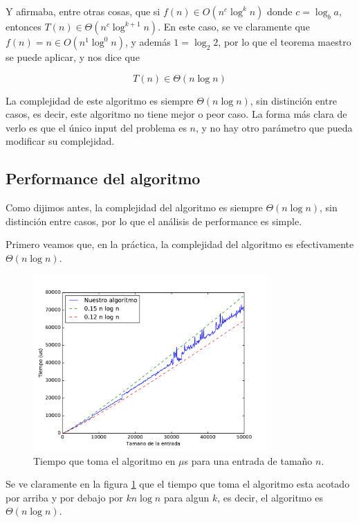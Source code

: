 Y afirmaba, entre otras cosas, que si $f(n) \in O(n^c \log^k n)$ donde $c = \log_b a$, entonces $T(n) \in \Theta(n^c \log^{k+1} n)$. En este caso, se ve claramente que $f(n) = n \in O(n^1 \log^0 n)$, y además $1 = \log_2 2$, por lo que el teorema maestro se puede aplicar, y nos dice que

\[T(n) \in \Theta(n \log n)\]

La complejidad de este algoritmo es siempre $\Theta(n \log n)$, sin distinción entre casos, es decir, este algoritmo no tiene mejor o peor caso. La forma más clara de verlo es que el único input del problema es $n$, y no hay otro parámetro que pueda modificar su complejidad.

\subsection{Performance del algoritmo}

Como dijimos antes, la complejidad del algoritmo es siempre $\Theta(n \log n)$, sin distinción entre casos, por lo que el análisis de performance es simple.

Primero veamos que, en la práctica, la complejidad del algoritmo es efectivamente $\Theta(n \log n)$.

\begin{figure}[H]
 \centering
	\includegraphics[width=0.8\textwidth]{img/tiempos/kaioken3.pdf}
	\caption{\footnotesize Tiempo que toma el algoritmo en $\mu$s para una entrada de tamaño $n$.}
	\label{fig:kaioken-tiempos3}
\end{figure}

Se ve claramente en la figura \ref{fig:kaioken-tiempos3} que el tiempo que toma el algoritmo esta acotado por arriba y por debajo por $k n \log n$ para algun $k$, es decir, el algoritmo es $\Theta(n \log n)$.

